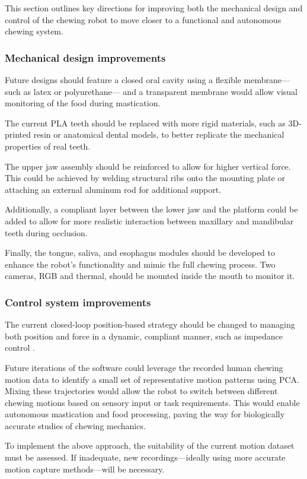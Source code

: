 This section outlines key directions for improving both the mechanical design and control of the chewing robot to move closer to a functional and autonomous chewing system.

\subsubsection{Mechanical design improvements}

Future designs should feature a closed oral cavity using a flexible membrane—such as latex or polyurethane— and a transparent membrane would allow visual monitoring of the food during mastication. 

The current PLA teeth should be replaced with more rigid materials, such as 3D-printed resin or anatomical dental models, to better replicate the mechanical properties of real teeth. 

The upper jaw assembly should be reinforced to allow for higher vertical force. This could be achieved by welding structural ribs onto the mounting plate or attaching 
an external aluminum rod for additional support. 

Additionally, a compliant layer between the lower jaw and the platform could be added to allow for more realistic interaction between maxillary and mandibular teeth during occlusion.

Finally, the tongue, saliva, and esophagus modules should be developed to enhance the robot's functionality and mimic the full chewing process. Two cameras, RGB and thermal, should be mounted inside the mouth to monitor it. 

\subsubsection{Control system improvements}

The current closed-loop position-based strategy should be changed to managing both position and force in a 
dynamic, compliant manner, such as impedance control \cite{impedance_control}.

Future iterations of the software could leverage the recorded human chewing motion data to identify a small set of representative motion patterns using PCA. Mixing these trajectories 
would allow the robot to switch between different chewing motions based on sensory input or task requirements. This would enable autonomous mastication and food processing, paving 
the way for biologically accurate studies of chewing mechanics.

To implement the above approach, the suitability of the current motion dataset must be assessed. If inadequate, new recordings—ideally using more accurate motion capture 
methods—will be necessary.


